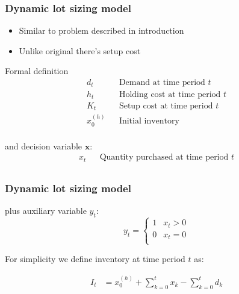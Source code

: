 \documentclass{beamer}
\begin{document}
\begin{frame}
    \frametitle{Dynamic lot sizing model}
    \begin{itemize}
        \item Similar to problem described in introduction
        \item Unlike original there's setup cost
    \end{itemize}

    \begin{block}{Formal definition}
        \begin{align*}
          d_t && \text{Demand at time period $t$} \\
          h_t && \text{Holding cost at time period $t$} \\
          K_t && \text{Setup cost at time period $t$} \\
          x^{(h)}_0 && \text{Initial inventory} \\
        \end{align*}

        and decision variable $\mathbf{x}$:
        \begin{align*}
                  x_t && \text{Quantity purchased at time period $t$}\\
        \end{align*}
    \end{block}
\end{frame}

\begin{frame}
    \frametitle{Dynamic lot sizing model}
    \begin{block}{}
        plus auxiliary variable $y_t$:
        \begin{equation*}
            y_t = \begin{cases}
                1 & x_t > 0 \\
                0 & x_t = 0 \\
            \end{cases}
        \end{equation*}

        For simplicity we define inventory at time period $t$ as:

        \begin{align*}
          I_t &= x^{(h)}_0 + \sum_{k=0}^t{x_k} - \sum_{k=0}^t{d_k}\\
        \end{align*}

    \end{block}
\end{frame}
\end{document}
